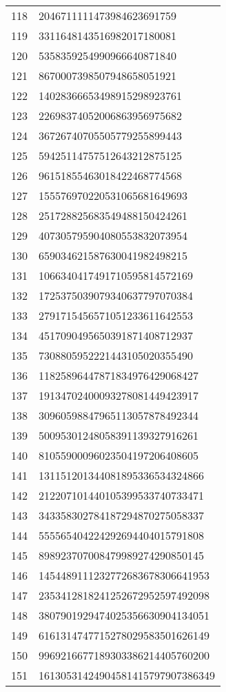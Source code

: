 \documentclass[12pt]{article}
\begin{document}
\begin{tabular}{l|l}
118 & 2046711111473984623691759 \\
119 & 3311648143516982017180081 \\
120 & 5358359254990966640871840 \\
121 & 8670007398507948658051921 \\
122 & 14028366653498915298923761 \\
123 & 22698374052006863956975682 \\
124 & 36726740705505779255899443 \\
125 & 59425114757512643212875125 \\
126 & 96151855463018422468774568 \\
127 & 155576970220531065681649693 \\
128 & 251728825683549488150424261 \\
129 & 407305795904080553832073954 \\
130 & 659034621587630041982498215 \\
131 & 1066340417491710595814572169 \\
132 & 1725375039079340637797070384 \\
133 & 2791715456571051233611642553 \\
134 & 4517090495650391871408712937 \\
135 & 7308805952221443105020355490 \\
136 & 11825896447871834976429068427 \\
137 & 19134702400093278081449423917 \\
138 & 30960598847965113057878492344 \\
139 & 50095301248058391139327916261 \\
140 & 81055900096023504197206408605 \\
141 & 131151201344081895336534324866 \\
142 & 212207101440105399533740733471 \\
143 & 343358302784187294870275058337 \\
144 & 555565404224292694404015791808 \\
145 & 898923707008479989274290850145 \\
146 & 1454489111232772683678306641953 \\
147 & 2353412818241252672952597492098 \\
148 & 3807901929474025356630904134051 \\
149 & 6161314747715278029583501626149 \\
150 & 9969216677189303386214405760200 \\
151 & 16130531424904581415797907386349 \\

\end{tabular}
\end{document}
